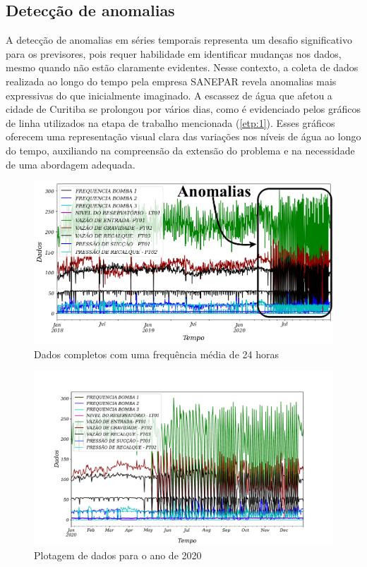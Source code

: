 

\subsection{Detec\c c\~ao de anomalias} \label{subsec:detec}



A detecção de anomalias em séries temporais representa um desafio significativo para os previsores, pois requer habilidade em identificar mudanças nos dados, mesmo quando não estão claramente evidentes. Nesse contexto, a coleta de dados realizada ao longo do tempo pela empresa SANEPAR revela anomalias mais expressivas do que inicialmente imaginado. A escassez de água que afetou a cidade de Curitiba se prolongou por vários dias, como é evidenciado pelos gráficos de linha utilizados na etapa de trabalho mencionada (\ref{etp:1}). Esses gráficos oferecem uma representação visual clara das variações nos níveis de água ao longo do tempo, auxiliando na compreensão da extensão do problema e na necessidade de uma abordagem adequada.

\begin{figure}[htp!]
	\centering
	\caption{Dados completos com uma frequência média de 24 horas}
	\label{fig:dados-todos}
	\includegraphics[width=0.9\linewidth]{"Introducao/Figuras/dados todos"}
	
\end{figure}

\begin{figure}[htp!]
	\centering
	\caption{Plotagem de dados para o ano de 2020}
	\label{fig:2020-a-frente}
	\includegraphics[width=0.9\linewidth]{"Introducao/Figuras/2020 a frente"}
	
\end{figure}



